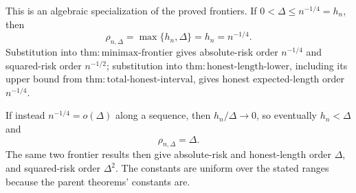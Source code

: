 This is an algebraic specialization of the proved frontiers.  If \(0<\Delta\le n^{-1/4}=h_n\), then
\[
 \rho_{n,\Delta}=\max\{h_n,\Delta\}=h_n=n^{-1/4}.
\]
Substitution into \(\mathrm{thm:minimax\text{-}frontier}\) gives absolute-risk order \(n^{-1/4}\) and squared-risk order \(n^{-1/2}\); substitution into \(\mathrm{thm:honest\text{-}length\text{-}lower}\), including its upper bound from \(\mathrm{thm:total\text{-}honest\text{-}interval}\), gives honest expected-length order \(n^{-1/4}\).

If instead \(n^{-1/4}=o(\Delta)\) along a sequence, then \(h_n/\Delta\to0\), so eventually \(h_n<\Delta\) and
\[
 \rho_{n,\Delta}=\Delta.
\]
The same two frontier results then give absolute-risk and honest-length order \(\Delta\), and squared-risk order \(\Delta^2\).  The constants are uniform over the stated ranges because the parent theorems' constants are.